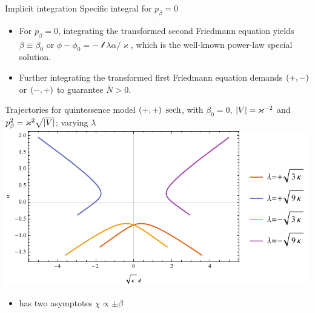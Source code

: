 \documentclass[9pt]{beamer}
\begin{document}
\begin{frame}%
{Implicit integration}%
{Specific integral for $p_\beta = 0$}
\begin{itemize}
\item For $p_\beta = 0$, integrating the transformed second Friedmann 
equation yields $\beta \equiv \beta_0$ or $\phi-\phi_0 =
-\mscrl\lambda\alpha/\varkappa$, which is the well-known power-law special
solution.

\item Further integrating the transformed first Friedmann equation demands 
${\left(+,-\right)}$ or ${\left(-,+\right)}$ to guarantee $\overline{N} > 0$.

\end{itemize}
\end{frame}




\begin{frame}%
{Trajectories for quintessence model ${\left(+,+\right)}$}%
{$\operatorname{sech}$, with $\beta_0 = 0$, ${\left|V\right|} = \varkappa^{-2}$ and
$p_\beta^2 = \varkappa^2\sqrt{{\left|V\right|}}$; varying $\lambda$}
\includegraphics[width=\textwidth]{../plots.nb/sech_lamb.pdf}
\begin{itemize}
	\item has two asymptotes $\chi \propto \pm \beta$
\end{itemize}
\end{frame}
\end{document}
